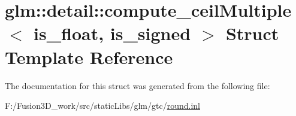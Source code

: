 \hypertarget{structglm_1_1detail_1_1compute__ceil_multiple}{}\section{glm\+:\+:detail\+:\+:compute\+\_\+ceil\+Multiple$<$ is\+\_\+float, is\+\_\+signed $>$ Struct Template Reference}
\label{structglm_1_1detail_1_1compute__ceil_multiple}


The documentation for this struct was generated from the following file\+:\begin{DoxyCompactItemize}
\item 
F\+:/\+Fusion3\+D\+\_\+work/src/static\+Libs/glm/gtc/\hyperlink{round_8inl}{round.\+inl}\end{DoxyCompactItemize}
